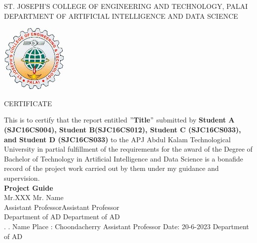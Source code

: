 \newpage
\thispagestyle{empty}
\begin{center}
\normalsize{ST. JOSEPH’S COLLEGE OF ENGINEERING AND TECHNOLOGY, PALAI}\\[0.5cm]
\normalsize
 { DEPARTMENT OF ARTIFICIAL INTELLIGENCE AND DATA SCIENCE}\\[1.0cm]%
   \begin{center}
   \includegraphics{SJCET_logo.jpg}
   \end{center}
{\large CERTIFICATE}\\[1.5cm]
\end{center}
\normalsize 
This is to certify that the report entitled {\bf $"$Title$"$} submitted by { \bf Student A (SJC16CS004), Student B(SJC16CS012), Student C (SJC16CS033), and Student D (SJC16CS033)} to the APJ Abdul Kalam Technological University in partial fulfillment of the requirements for the award of the Degree of Bachelor of Technology in Artificial Intelligence and Data Science is a bonafide record of the project work carried out by them under my guidance and supervision.\vspace{1.3 cm}\\
{\bf Project Guide}\hspace{8.4 cm}{\bf Project Coordinator}\\
Mr.XXX\hspace{9.6 cm} Mr. Name\\
Assistant Professor\hspace{8.0 cm}Assistant Professor\hspace{2.8 cm}\\Department of 
 AD\hspace{7.9 cm} Department of AD
\vspace{1.3 cm}\\
.\hspace{11.25 cm}{ \bf Head of Department}
\newline
.\hspace{11.25 cm} Name
\newline
Place : Choondacherry  \hspace{7.12 cm} Assistant Professor
\newline
Date\hspace{0.25 cm}: 20-6-2023 \hspace{8.05 cm} Department of AD
                
